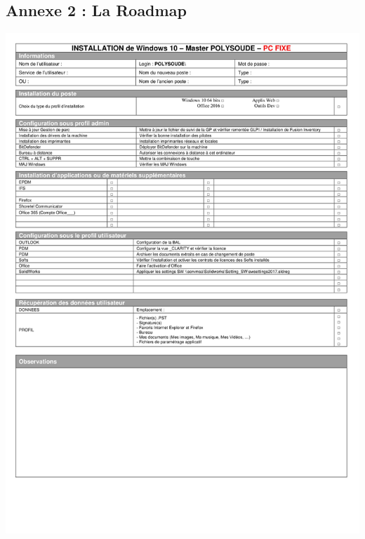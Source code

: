 \documentclass[11pt,a4paper,oneside]{article}
\begin{document}
\subsection*{Annexe 2 : La Roadmap}
\includegraphics[width=\textwidth]{Ressources/Roadmap.jpg}
\end{document}
